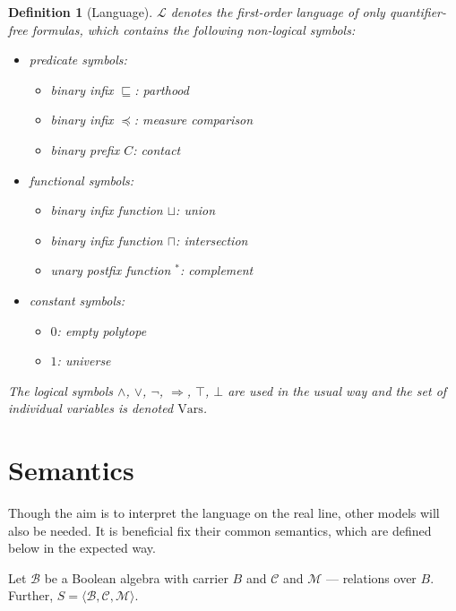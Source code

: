 \documentclass{article}
\newtheorem*{definition}{Definition}
\newcommand{\B}{\mathcal{B}}
\newcommand{\lang}{\mathcal{L}}
\newcommand{\Vars}{\text{Vars}}
\newcommand{\lcup}{\sqcup}
\newcommand{\lcap}{\sqcap}
\newcommand{\lstar}{^*}
\newcommand{\lpart}{\sqsubseteq}
\newcommand{\lcont}{C}
\newcommand{\lmeasure}{\preceq}
\begin{document}
\begin{definition}[Language]
$\lang$ denotes the first-order language of only quantifier-free formulas, which contains the following non-logical symbols:
\begin{itemize}
  \item predicate symbols:
  \begin{itemize}
  \item binary infix $\lpart$: parthood
  \item binary infix $\lmeasure$: measure comparison
  \item binary prefix $\lcont$: contact
  \end{itemize}
  \item functional symbols:
  \begin{itemize}
  \item binary infix function $\lcup$: union
  \item binary infix function $\lcap$: intersection
  \item unary postfix function $\lstar$: complement
  \end{itemize}
  \item constant symbols:
  \begin{itemize}
  \item $0$: empty polytope
  \item $1$: universe
  \end{itemize}
\end{itemize}

The logical symbols $\land$, $\lor$, $\lnot$, $\Rightarrow$, $\top$, $\bot$ are used in the usual way and the set of individual variables is denoted $\Vars$.

\end{definition}

\section{Semantics}

Though the aim is to interpret the language on the real line, other models will also be needed. It is beneficial fix their common semantics, which are defined below in the expected way.

Let $\B$ be a Boolean algebra with carrier $B$ and $\mathcal{C}$ and $\mathcal{M}$ --- relations over $B$. Further, $S = \langle \B, \mathcal{C}, \mathcal{M} \rangle$.
\end{document}
